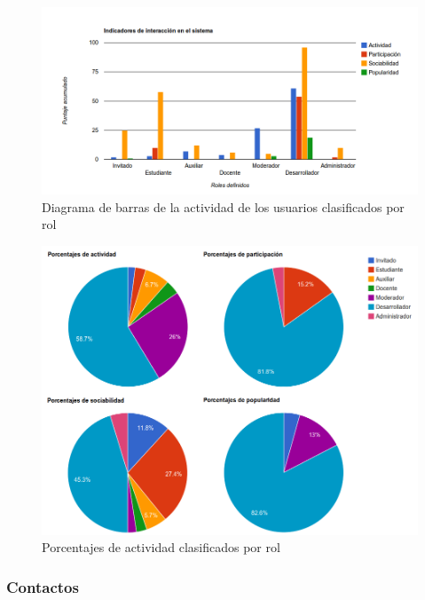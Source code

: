 \begin{figure}[H]
\centering
 \includegraphics[scale=0.4]{graphics/usuarios_bars_2.png}
 \caption {Diagrama de barras de la actividad de los usuarios clasificados por rol}
 \label {usuarios_bars_2}
\end{figure}

\begin{figure}[H]
\centering
    \includegraphics[scale=0.4]{graphics/usuarios_pie_2.png}
    \caption {Porcentajes de actividad clasificados por rol}
    \label {usuarios_pie_2}
\end{figure}

\subsubsection{Contactos}

